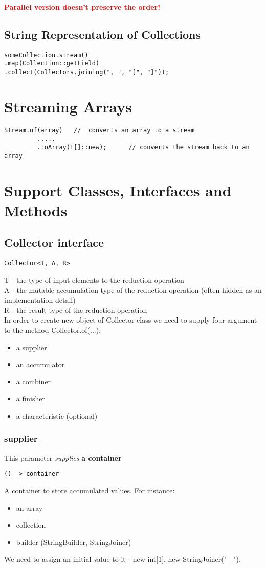 \documentclass{report}
\begin{document}
\textbf{\textcolor{red}{Parallel version doesn't preserve the order!}}

\section{String Representation of Collections}
\begin{verbatim}
someCollection.stream()
.map(Collection::getField)
.collect(Collectors.joining(", ", "[", "]"));
\end{verbatim}

\chapter{Streaming Arrays}
\begin{verbatim}
Stream.of(array)   //  converts an array to a stream
         .....
         .toArray(T[]::new);      // converts the stream back to an array
\end{verbatim}

\chapter{Support Classes, Interfaces and Methods}
\section{Collector interface}
\begin{verbatim}
Collector<T, A, R>
\end{verbatim}
T - the type of input elements to the reduction operation\\
A - the mutable accumulation type of the reduction operation (often hidden as an implementation detail)\\
R - the result type of the reduction operation\\

In order to create new object of Collector class we need to supply four argument to the method Collector.of(...):
\begin{itemize}
	\item a supplier
	\item an accumulator
	\item a combiner
	\item a finisher
	\item a characteristic (optional)
\end{itemize}

\subsection{supplier}
This parameter \textit{supplies} \textbf{a container}
\begin{verbatim}
() -> container
\end{verbatim}
A container to store accumulated values. For instance:
\begin{itemize}
	\item an array
	\item collection
	\item builder (StringBuilder, StringJoiner)
\end{itemize}
We need to assign an initial value to it - new int[1], new StringJoiner(" | "). 
\end{document}
